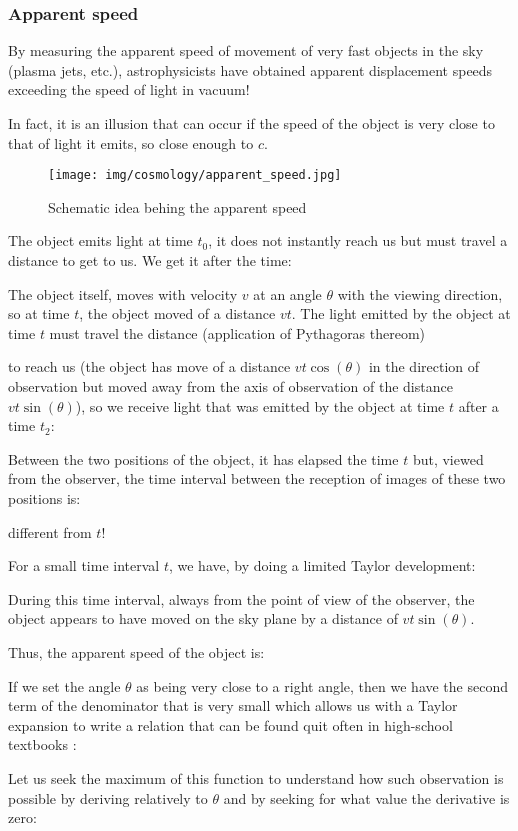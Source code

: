 	\subsubsection{Apparent speed}
	By measuring the apparent speed of movement of very fast objects in the sky (plasma jets, etc.), astrophysicists have obtained apparent displacement speeds exceeding the speed of light in vacuum!

	In fact, it is an illusion that can occur if the speed of the object is very close to that of light it emits, so close enough to $c$.
	\begin{figure}[H]
		\centering
		\texttt{[image: img/cosmology/apparent\_speed.jpg]}
		\caption{Schematic idea behing the apparent speed}
	\end{figure}
	The object emits light at time $t_0$, it does not instantly reach us but must travel a distance to get to us. We get it after the time:
	
	The object itself, moves with velocity $v$ at an angle $\theta$ with the viewing direction, so at time $t$, the object moved of a distance $vt$. The light emitted by the object at time $t$ must travel the distance (application of Pythagoras thereom)
	
	to reach us (the object has move of a distance $vt\cos(\theta)$ in the direction of observation but moved away from the axis of observation of the distance $vt\sin(\theta)$), so we receive light that was emitted by the object at time $t$ after a time $t_2$:
	
	Between the two positions of the object, it has elapsed the time $t$ but, viewed from the observer, the time interval between the reception of images of these two positions is:
	
	different from $t$!
	
	For a small time interval $t$, we have, by doing a limited Taylor development:
	
	During this time interval, always from the point of view of the observer, the object appears to have moved on the sky plane by a distance of $vt\sin(\theta)$.

	Thus, the apparent speed of the object is:
	
	If we set the angle $\theta$ as being very close to a right angle, then we have the second term of the denominator that is very small which allows us with a Taylor expansion to write a relation that can be found quit often in high-school textbooks :
	
	Let us seek the maximum of this function to understand how such observation is possible by deriving relatively to $\theta$ and by seeking for what value the derivative is zero:
	
